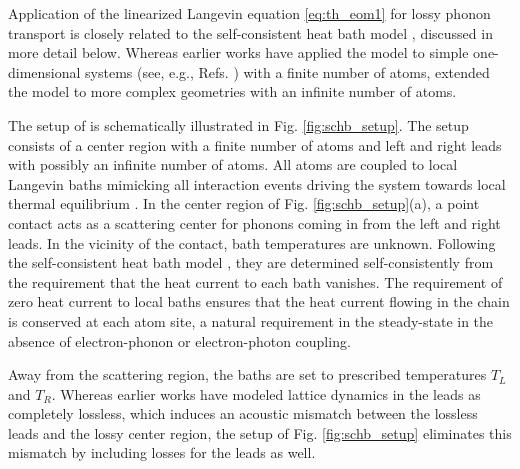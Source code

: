 Application of the linearized Langevin equation \eqref{eq:th_eom1} for lossy phonon transport is closely related to the self-consistent heat bath model \cite{bolsterli70}, discussed in more detail below. Whereas earlier works have applied the model to simple one-dimensional systems (see, e.g., Refs. \cite{bolsterli70,visscher75,dhar03,dhar06,segal09,bandyopadhyay11}) with a finite number of atoms,  extended the model to more complex geometries with an infinite number of atoms.  %

The setup of  is schematically illustrated in Fig. \ref{fig:schb_setup}. The setup consists of a center region with a finite number of atoms and left and right leads with possibly an infinite number of atoms. All atoms are coupled to local Langevin baths mimicking all interaction events driving the system towards local thermal equilibrium \cite{bolsterli70}. In the center region of Fig. \ref{fig:schb_setup}(a), a point contact acts as a scattering center for phonons coming in from the left and right leads. In the vicinity of the contact, bath temperatures are unknown. Following the self-consistent heat bath model \cite{bolsterli70}, they are determined self-consistently from the requirement that the heat current to each bath vanishes. The requirement of zero heat current to local baths ensures that the heat current flowing in the chain is conserved at each atom site, a natural requirement in the steady-state in the absence of electron-phonon or electron-photon coupling.

Away from the scattering region, the baths are set to prescribed temperatures $T_L$ and $T_R$. Whereas earlier works \cite{dhar06} have modeled lattice dynamics in the leads as completely lossless, which induces an acoustic mismatch between the lossless leads and the lossy center region, the setup of Fig. \ref{fig:schb_setup} eliminates this mismatch by including losses for the leads as well.  %


